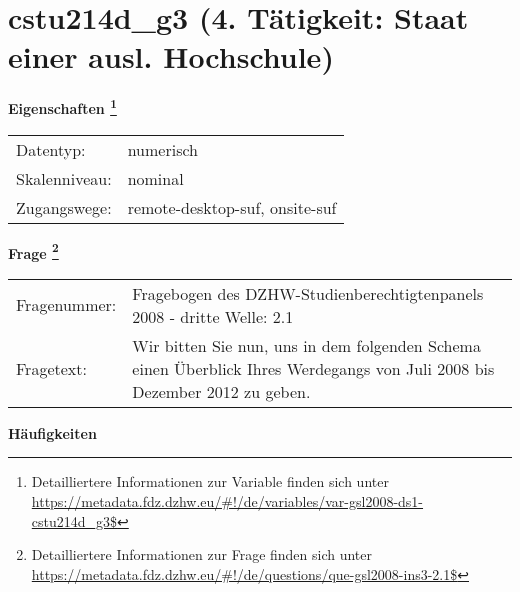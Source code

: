 
    \setcounter{footnote}{0}

    \vspace*{-1.8cm}
	\section{cstu214d\_g3 (4. Tätigkeit: Staat einer ausl. Hochschule)}
	\label{section:cstu214d_g3}



    \vspace*{0.5cm}
    \noindent\textbf{Eigenschaften
	\footnote{Detailliertere Informationen zur Variable finden sich unter
		\url{https://metadata.fdz.dzhw.eu/\#!/de/variables/var-gsl2008-ds1-cstu214d_g3$}}}\\
	\begin{tabularx}{\hsize}{@{}lX}
	Datentyp: & numerisch \\
	Skalenniveau: & nominal \\
	Zugangswege: &
	  remote-desktop-suf, 
	  onsite-suf
 \\
    \end{tabularx}



				\vspace*{0.5cm}
                \noindent\textbf{Frage
	                \footnote{Detailliertere Informationen zur Frage finden sich unter
		              \url{https://metadata.fdz.dzhw.eu/\#!/de/questions/que-gsl2008-ins3-2.1$}}}\\
				\begin{tabularx}{\hsize}{@{}lX}
					Fragenummer: &
					  Fragebogen des DZHW-Studienberechtigtenpanels 2008 - dritte Welle:
					  2.1
 \\
					Fragetext: & Wir bitten Sie nun, uns in dem folgenden Schema einen Überblick Ihres Werdegangs von Juli 2008 bis Dezember 2012 zu geben. \\
				\end{tabularx}





        		\vspace*{0.5cm}
                \noindent\textbf{Häufigkeiten}

